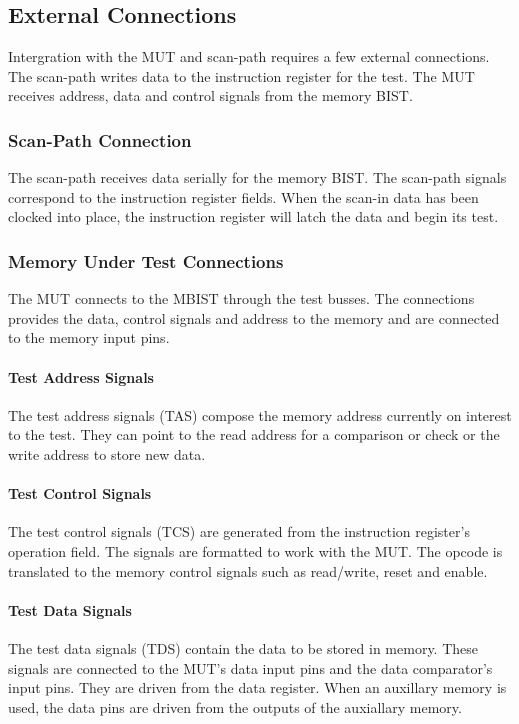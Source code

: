 \subsection{External Connections}
Intergration with the MUT and scan-path requires a few external connections.  The scan-path writes data to the instruction register for the test.  The MUT receives address, data and control signals from the memory BIST.

\subsubsection{Scan-Path Connection}
The scan-path receives data serially for the memory BIST.  The scan-path signals correspond to the instruction register fields.  When the scan-in data has been clocked into place, the instruction register will latch the data and begin its test.  

\subsubsection{Memory Under Test Connections}
The MUT connects to the MBIST through the test busses.  The connections provides the data, control signals and address to the memory and are connected to the memory input pins.  

\paragraph{Test Address Signals}
The test address signals (TAS) compose the memory address currently on interest to the test.  They can point to the read address for a comparison or check or the write address to store new data.

\paragraph{Test Control Signals}
The test control signals (TCS) are generated from the instruction register's operation field.  The signals are formatted to work with the MUT.  The opcode is translated to the memory control signals such as read/write, reset and enable.  

\paragraph{Test Data Signals}
The test data signals (TDS) contain the data to be stored in memory.  These signals are connected to the MUT's data input pins and the data comparator's input pins.  They are driven from the data register.  When an auxillary memory is used, the data pins are driven from the outputs of the auxiallary memory.

